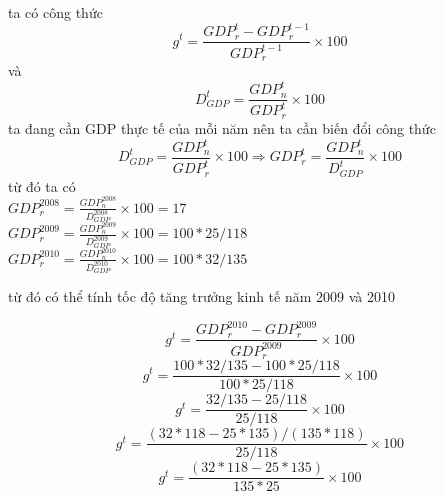 ta có công thức
$$g^t = \frac{GDP^{t}_r - GDP^{t - 1}_r}{GDP^{t - 1}_r} \times 100  $$
và
$$D^t_{GDP} = \frac{GDP^t_n}{GDP^t_r} \times 100$$
ta đang cần GDP thực tế của mỗi năm nên ta cần biến đổi công thức 
$$D^t_{GDP} = \frac{GDP^t_n}{GDP^t_r} \times 100 \Rightarrow GDP^t_r = \frac{GDP^t_n}{D^t_{GDP}} \times 100$$
từ đó 
ta có \\
$GDP^{2008}_r = \frac{GDP^{2008}_n}{D^{2008}_{GDP}} \times 100 = 17$\\
$GDP^{2009}_r = \frac{GDP^{2009}_n}{D^{2009}_{GDP}} \times 100 = 100 * 25 / 118$\\
$GDP^{2010}_r = \frac{GDP^{2010}_n}{D^{2010}_{GDP}} \times 100 = 100 * 32 / 135$

từ đó có thể tính tốc độ tăng trưởng kinh tế năm 2009 và 2010

$$g^t = \frac{GDP^{2010}_r - GDP^{2009}_r}{GDP^{2009}_r} \times 100  $$
$$g^t = \frac{100 * 32 / 135 - 100 * 25 / 118}{100 * 25 / 118} \times 100  $$
$$g^t = \frac{ 32 / 135 -  25 / 118}{25 / 118} \times 100  $$
$$g^t = \frac{ (32 * 118 - 25 * 135) / (135 * 118)}{25 / 118} \times 100  $$
$$g^t = \frac{ (32 * 118 - 25 * 135) }{ 135 * 25} \times 100  $$